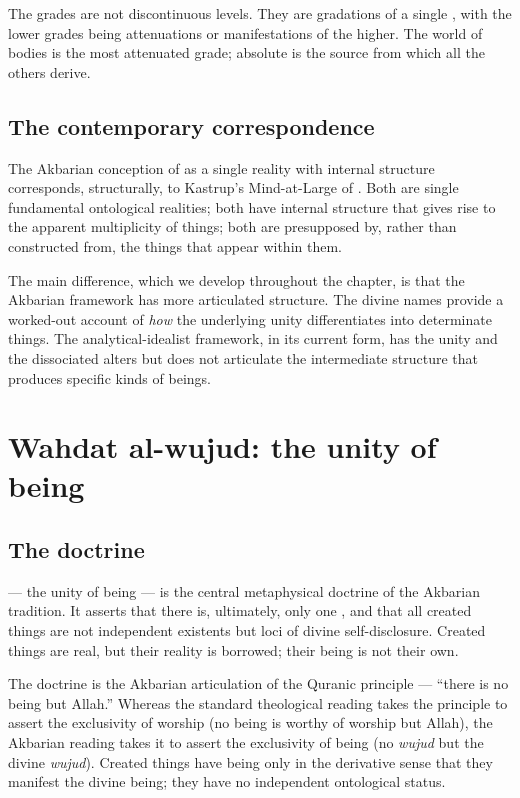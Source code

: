 The grades are not discontinuous levels. They are gradations of a
single , with the lower grades being attenuations or
manifestations of the higher. The world of bodies is the most
attenuated grade; absolute  is the source from which
all the others derive.

\subsection{The contemporary correspondence}

The Akbarian conception of  as a single reality with
internal structure corresponds, structurally, to Kastrup's
Mind-at-Large of . Both are single
fundamental ontological realities; both have internal structure
that gives rise to the apparent multiplicity of things; both are
presupposed by, rather than constructed from, the things that
appear within them.

The main difference, which we develop throughout the chapter, is
that the Akbarian framework has more articulated structure. The
divine names provide a worked-out account of \emph{how} the
underlying unity differentiates into determinate things. The
analytical-idealist framework, in its current form, has the unity
and the dissociated alters but does not articulate the
intermediate structure that produces specific kinds of beings.

\section{Wahdat al-wujud: the unity of being}
\label{sec:wahdat-al-wujud-detail}

\subsection{The doctrine}

\begin{conceptbox}
\label{conc:wahdat}
 --- the unity of being --- is the central
metaphysical doctrine of the Akbarian tradition. It asserts that
there is, ultimately, only one , and that all created
things are not independent existents but loci of divine
self-disclosure. Created things are real, but their reality is
borrowed; their being is not their own.
\end{conceptbox}

The doctrine is the Akbarian articulation of the Quranic principle
 --- ``there is no being but Allah.''
Whereas the standard theological reading takes the principle to
assert the exclusivity of worship (no being is worthy of worship
but Allah), the Akbarian reading takes it to assert the exclusivity
of being (no \emph{wujud} but the divine \emph{wujud}). Created
things have being only in the derivative sense that they manifest
the divine being; they have no independent ontological status.

